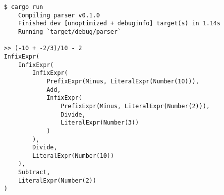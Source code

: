 \begin{lstlisting}
$ cargo run
    Compiling parser v0.1.0 
    Finished dev [unoptimized + debuginfo] target(s) in 1.14s
    Running `target/debug/parser`

>> (-10 + -2/3)/10 - 2
InfixExpr(
    InfixExpr(
        InfixExpr(
            PrefixExpr(Minus, LiteralExpr(Number(10))), 
            Add, 
            InfixExpr(
                PrefixExpr(Minus, LiteralExpr(Number(2))), 
                Divide, 
                LiteralExpr(Number(3))
            )
        ), 
        Divide, 
        LiteralExpr(Number(10))
    ), 
    Subtract, 
    LiteralExpr(Number(2))
)
\end{lstlisting}
